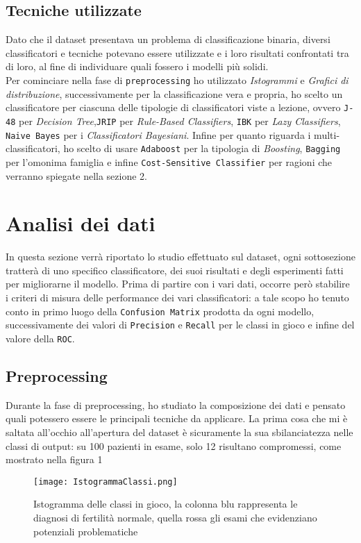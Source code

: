   \subsection{Tecniche utilizzate}
  Dato che il dataset presentava un problema di classificazione binaria, diversi classificatori e tecniche potevano essere utilizzate e i loro risultati confrontati tra di loro, al fine di individuare quali fossero i modelli più solidi.\\
  Per cominciare nella fase di \texttt{preprocessing} ho utilizzato \textit{Istogrammi} e \textit{Grafici di distribuzione}, successivamente per la classificazione vera e propria, ho scelto un classificatore per ciascuna delle tipologie di classificatori viste a lezione, ovvero \texttt{J-48} per \textit{Decision Tree},\texttt{JRIP} per \textit{Rule-Based Classifiers}, \texttt{IBK} per \textit{Lazy Classifiers}, \texttt{Naive Bayes} per i \textit{Classificatori Bayesiani}.
  Infine per quanto riguarda i multi-classificatori, ho scelto di usare \texttt{Adaboost} per la tipologia di \textit{Boosting}, \texttt{Bagging} per l'omonima famiglia e infine \texttt{Cost-Sensitive Classifier} per ragioni che verranno spiegate nella sezione 2.
  \section{Analisi dei dati}
  In questa sezione verrà riportato lo studio effettuato sul dataset, ogni sottosezione tratterà di uno specifico classificatore, dei suoi risultati e degli esperimenti fatti per migliorarne il modello.
  Prima di partire con i vari dati, occorre però stabilire i criteri di misura delle performance dei vari classificatori: a tale scopo ho tenuto conto in primo luogo della \texttt{Confusion Matrix} prodotta da ogni modello, successivamente dei valori di \texttt{Precision} e \texttt{Recall} per le classi in gioco e infine del valore della \texttt{ROC}.
  \subsection{Preprocessing}
  Durante la fase di preprocessing, ho studiato la composizione dei dati e pensato quali potessero essere le principali tecniche da applicare.
  La prima cosa che mi è saltata all'occhio all'apertura del dataset è sicuramente la sua sbilanciatezza nelle classi di output: su 100 pazienti in esame, solo 12 risultano compromessi, come mostrato nella figura 1
  
  \begin{figure}[H]
  	\texttt{[image: IstogrammaClassi.png]}
  	\caption{Istogramma delle classi in gioco, la colonna blu rappresenta le diagnosi di fertilità normale, quella rossa gli esami che evidenziano potenziali problematiche}
  \end{figure}

